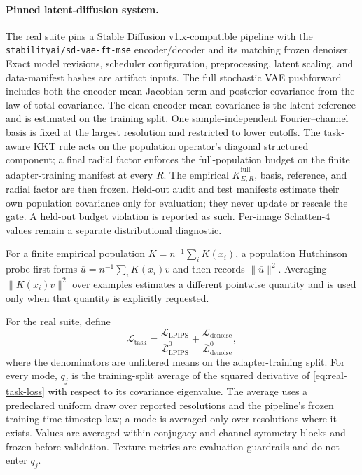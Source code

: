 \paragraph{Pinned latent-diffusion system.}
The real suite pins a Stable Diffusion v1.x-compatible pipeline with the
\texttt{stabilityai/sd-vae-ft-mse} encoder/decoder and its matching frozen
denoiser. Exact model revisions, scheduler configuration, preprocessing, latent
scaling, and data-manifest hashes are artifact inputs. The full stochastic VAE
pushforward includes both the encoder-mean Jacobian term and posterior
covariance from the law of total covariance. The clean encoder-mean covariance
is the latent reference and is estimated on the training split. One
sample-independent Fourier--channel basis is fixed at the largest resolution
and restricted to lower cutoffs. The task-aware KKT rule acts on the population
operator's diagonal structured component; a final radial factor enforces the
full-population budget on the finite adapter-training manifest at every $R$.
The empirical $\overline K_{E,R}^{\mathrm{full}}$, basis, reference, and radial
factor are then frozen. Held-out audit and test manifests estimate their own
population covariance only for evaluation; they never update or rescale the
gate. A held-out budget violation is reported as such. Per-image Schatten-$4$
values remain a separate distributional diagnostic.

For a finite empirical population
$\overline K=n^{-1}\sum_iK(x_i)$, a population Hutchinson probe first forms
$\overline u=n^{-1}\sum_iK(x_i)v$ and then records
$\lVert\overline u\rVert^2$. Averaging
$\lVert K(x_i)v\rVert^2$ over examples estimates a different pointwise
quantity and is used only when that quantity is explicitly requested.

For the real suite, define
\begin{equation}
  \mathcal L_{\mathrm{task}}
  =\frac{\mathcal L_{\mathrm{LPIPS}}}
         {\overline{\mathcal L}_{\mathrm{LPIPS}}^{0}}
   +\frac{\mathcal L_{\mathrm{denoise}}}
         {\overline{\mathcal L}_{\mathrm{denoise}}^{0}},
  \label{eq:real-task-loss}
\end{equation}
where the denominators are unfiltered means on the adapter-training split.
For every mode, $q_j$ is the training-split average of the squared derivative
of \cref{eq:real-task-loss} with respect to its covariance eigenvalue. The
average uses a predeclared uniform draw over reported resolutions and the
pipeline's frozen training-time timestep law; a mode is averaged only over
resolutions where it exists. Values are averaged within conjugacy and channel
symmetry blocks and frozen before validation. Texture metrics are evaluation
guardrails and do not enter $q_j$.

